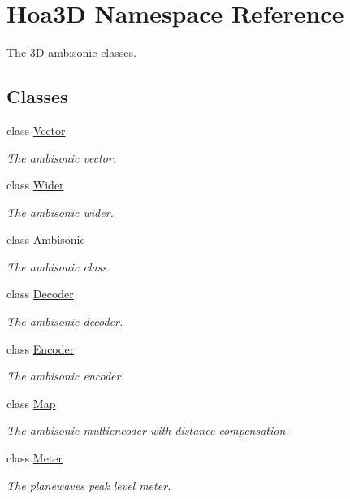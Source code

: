\hypertarget{namespace_hoa3_d}{\section{Hoa3\-D Namespace Reference}
\label{namespace_hoa3_d}
}


The 3\-D ambisonic classes.  


\subsection*{Classes}
\begin{DoxyCompactItemize}
\item 
class \hyperlink{class_hoa3_d_1_1_vector}{Vector}
\begin{DoxyCompactList}\small\item\em The ambisonic vector. \end{DoxyCompactList}\item 
class \hyperlink{class_hoa3_d_1_1_wider}{Wider}
\begin{DoxyCompactList}\small\item\em The ambisonic wider. \end{DoxyCompactList}\item 
class \hyperlink{class_hoa3_d_1_1_ambisonic}{Ambisonic}
\begin{DoxyCompactList}\small\item\em The ambisonic class. \end{DoxyCompactList}\item 
class \hyperlink{class_hoa3_d_1_1_decoder}{Decoder}
\begin{DoxyCompactList}\small\item\em The ambisonic decoder. \end{DoxyCompactList}\item 
class \hyperlink{class_hoa3_d_1_1_encoder}{Encoder}
\begin{DoxyCompactList}\small\item\em The ambisonic encoder. \end{DoxyCompactList}\item 
class \hyperlink{class_hoa3_d_1_1_map}{Map}
\begin{DoxyCompactList}\small\item\em The ambisonic multiencoder with distance compensation. \end{DoxyCompactList}\item 
class \hyperlink{class_hoa3_d_1_1_meter}{Meter}
\begin{DoxyCompactList}\small\item\em The planewaves peak level meter. \end{DoxyCompactList}\item 

\end{DoxyCompactItemize}
